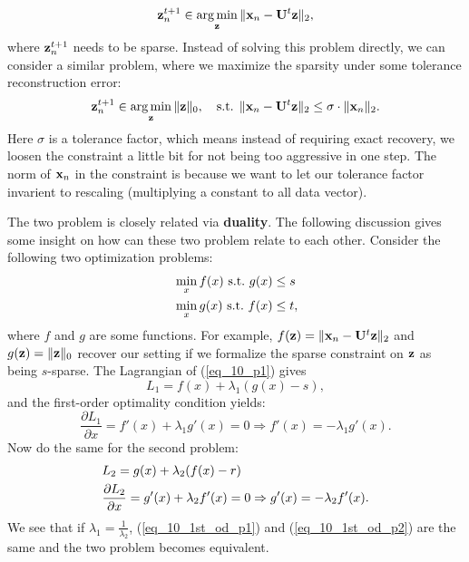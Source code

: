 \documentclass[../book-template.tex]{subfiles}
\begin{document}
\begin{equation*}
	{\bf z}_n^{t+1}\in \mathop{\arg\min}_{\bf z}\|{\bf x}_n-{\bf U}^t {\bf z}\|_2,
\end{equation*}
where ${\bf z}_n^{t+1}$ needs to be sparse. Instead of solving this problem directly, we can consider a similar problem, where we maximize the sparsity under some tolerance reconstruction error:
\begin{equation}\label{eq_10_coding_pblm}
	{\bf z}_n^{t+1} \in \mathop{\arg\min}_{\bf z} \|{\bf z}\|_0,\quad \text{s.t. }\|{\bf x}_n-{\bf U}^t {\bf z}\|_2\leq \sigma\cdot \|{\bf x}_n\|_2.
\end{equation}
Here $\sigma$ is a tolerance factor, which means instead of requiring exact recovery, we loosen the constraint a little bit for not being too aggressive in one step. The norm of ${\bf x}_n$ in the constraint is because we want to let our tolerance factor invarient to rescaling (multiplying a constant to all data vector). 
\par The two problem is closely related via \textbf{duality}. The following discussion gives some insight on how can these two problem relate to each other. Consider the following two optimization problems:
\begin{align}
	\label{eq_10_p1}&\min_x f(x)\ {\rm s.t.}\ g(x)\leq s\\
	\label{eq_10_p2}&\min_x g(x)\ {\rm s.t.}\ f(x)\leq t,
\end{align}
where $f$ and $g$ are some functions. For example, $f({\bf z}) = \|{\bf x}_n-{\bf U}^t {\bf z}\|_2$ and $g({\bf z}) = \|{\bf z}\|_0$ recover our setting if we formalize the sparse constraint on ${\bf z}$ as being $s$-sparse.
The Lagrangian of (\ref{eq_10_p1}) gives
\begin{equation*}
	L_1 = f(x)+\lambda_1(g(x)-s),
\end{equation*}
and the first-order optimality condition yields:
\begin{equation}\label{eq_10_1st_od_p1}
	\frac{\partial L_1}{\partial x}=f'(x)+\lambda_1g'(x)=0\Rightarrow f'(x)=-\lambda_1g'(x).
\end{equation}
Now do the same for the second problem:
\begin{align}
	&L_2 = g(x)+\lambda_2(f(x)-r)\notag \\
	\label{eq_10_1st_od_p2}&\frac{\partial L_2}{\partial x}=g'(x)+\lambda_2f'(x)=0\Rightarrow g'(x)=-\lambda_2f'(x).
\end{align}
We see that if $\lambda_1=\frac{1}{\lambda_2}$, (\ref{eq_10_1st_od_p1}) and (\ref{eq_10_1st_od_p2}) are the same and the two problem becomes equivalent. 
\end{document}
